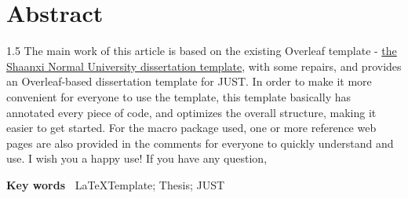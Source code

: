\chapter[Abstract]{Abstract}
\begin{spacing}{1.5}
The main work of this article is based on the existing Overleaf template - \href{https://cn.overleaf.com/latex/templates/shan-shi-da-xue-wei-lun-wen-mo-ban/cszgkzrnfkkr}{the Shaanxi Normal University dissertation template}, with some repairs, and provides an Overleaf-based dissertation template for JUST.
In order to make it more convenient for everyone to use the template, 
this template basically has annotated every piece of code, and optimizes the overall structure, 
making it easier to get started.
For the macro package used, 
one or more reference web pages are also provided in the comments for everyone to quickly understand and use. I wish you a happy use! If you have any question,  
\end{spacing}

\textbf{Key words~} \LaTeX Template; Thesis; JUST

\clearpage									%

